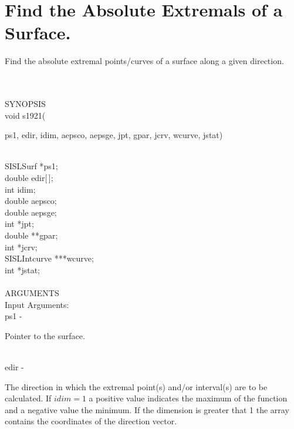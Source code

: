 \section{Find the Absolute Extremals of a Surface.}
\begin{minipg1}
  Find the absolute extremal points/curves of a surface along a given direction.
\end{minipg1}\\ \\
SYNOPSIS\\
        \>void s1921(\begin{minipg3}
          {\fov ps1}, {\fov edir}, {\fov idim}, {\fov aepsco}, {\fov aepsge}, {\fov jpt}, {\fov gpar}, {\fov jcrv}, {\fov wcurve}, {\fov jstat})
        \end{minipg3}\\[0.3ex]
        \>\>    SISLSurf  \>  *{\fov ps1};\\
        \>\>    double    \>  {\fov edir}[\,];\\
        \>\>    int       \>  {\fov idim};\\
        \>\>    double    \>  {\fov aepsco};\\
        \>\>    double    \>  {\fov aepsge};\\
        \>\>    int       \>  *{\fov jpt};\\
        \>\>    double    \>  **{\fov gpar};\\
        \>\>    int       \>  *{\fov jcrv};\\
        \>\>    SISLIntcurve \> ***{\fov wcurve};\\
        \>\>    int       \>  *{\fov jstat};\\
\\
ARGUMENTS\\
        \>Input Arguments:\\
        \>\>    {\fov ps1}\> - \>  \begin{minipg2}
                     Pointer to the surface.
                               \end{minipg2}\\
        \>\>    {\fov edir}\> - \>
        \begin{minipg2}
          The direction in which the extremal point(s)
          and/or interval(s) are to be calculated. If
          $idim=1$ a positive value indicates the maximum
          of the function and a negative value
          the minimum. If the dimension is greater that
          1 the array contains the coordinates of the
          direction vector.
        \end{minipg2}\\[0.8ex]
